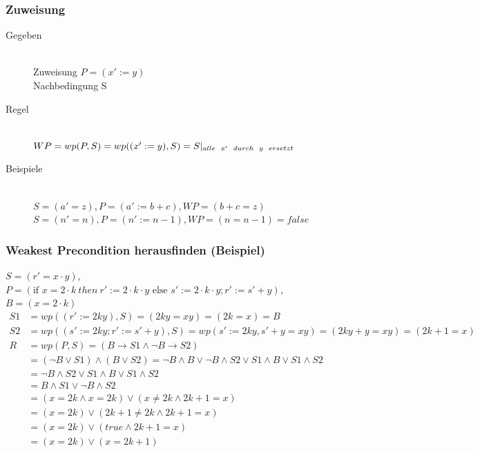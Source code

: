 \documentclass[a4paper,10pt]{article}
\newcommand{\T}[1]{\text{#1}} %
\begin{document}
\subsubsection{Zuweisung}
\begin{description}
	\item[Gegeben] \hfill \\
		Zuweisung $P = (x' := y)$ \\
		Nachbedingung S
	\item[Regel] \hfill \\
		$WP = wp(P, S) = wp((x' := y), S) = S |_{alle \hspace{2mm} x' \hspace{2mm} durch \hspace{2mm} y \hspace{2mm} ersetzt}$
	\item[Beispiele] \hfill \\
		$S = (a' = z), P = (a' := b + c), WP = (b + c = z)$ \\
		$S = (n' = n), P = (n' := n-1), WP = (n = n-1) = false$
\end{description}
\subsubsection{Weakest Precondition herausfinden (Beispiel)}
$S=(r'=x\cdot y)$, $P=(\T{if }x=2\cdot k ~then~ r' := 2\cdot k\cdot y\T{ else }s':=2\cdot k\cdot y;r':=s'+y)$, $B=(x=2\cdot k)$
\begin{align*}
S1&=wp((r':=2ky),S)=(2ky=xy)=(2k=x)=B\\
S2&=wp((s':=2ky;r':=s'+y),S)=wp(s':=2ky,s'+y=xy)=(2ky+y=xy)=(2k+1=x)\\
R&=wp(P,S)=(B\to S1\wedge\neg B\to S2)\\
&=(\neg B\vee S1)\wedge(B\vee S2)=\neg B\wedge B\vee\neg B\wedge S2\vee S1\wedge B\vee S1\wedge S2\\
&=\neg B\wedge S2\vee S1\wedge B \vee S1\wedge S2\\
&=B\wedge S1\vee\neg B\wedge S2\\
&=(x=2k\wedge x=2k)\vee(x\neq 2k\wedge 2k+1=x)\\
&=(x=2k)\vee(2k+1\neq 2k\wedge 2k+1=x)\\
&=(x=2k)\vee(true\wedge 2k+1=x)\\
&=(x=2k)\vee(x=2k+1)
\end{align*}
\end{document}
